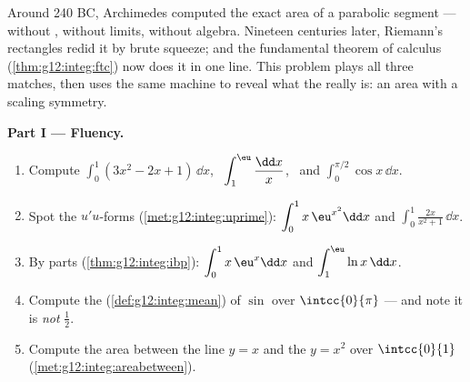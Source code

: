 \begin{problem}
\label{pb:g12:integ:1}
Around 240 BC, Archimedes computed the exact area of a parabolic
segment --- without , without limits, without algebra.
Nineteen centuries later, Riemann's rectangles redid it by brute
squeeze; and the fundamental theorem of calculus
(\cref{thm:g12:integ:ftc}) now does it in one line. This problem
plays all three matches, then uses the same machine to reveal
what the  really is: an area with a scaling symmetry.

\medskip
\noindent\textbf{Part I --- Fluency.}
\begin{enumerate}
  \item Compute $\displaystyle\int_0^1 (3x^2 - 2x + 1)\,\dd x$,
        \ $\displaystyle\int_1^{\eu} \frac{\dd x}{x}$, \ and
        $\displaystyle\int_0^{\pi/2} \cos x\,\dd x$.
  \item Spot the $u'u$-forms
        (\cref{met:g12:integ:uprime}):
        $\displaystyle\int_0^1 x\,\eu^{x^2}\dd x$ and
        $\displaystyle\int_0^1 \frac{2x}{x^2 + 1}\,\dd x$.
  \item By parts (\cref{thm:g12:integ:ibp}):
        $\displaystyle\int_0^1 x\,\eu^x \dd x$ and
        $\displaystyle\int_1^{\eu} \ln x\,\dd x$.
  \item Compute the 
        (\cref{def:g12:integ:mean}) of $\sin$ over
        $\intcc{0}{\pi}$ --- and note it is \emph{not}
        $\frac12$.
  \item Compute the area between the line $y = x$ and the
         $y = x^2$ over $\intcc{0}{1}$
        (\cref{met:g12:integ:areabetween}).
\end{enumerate}


\end{problem}
